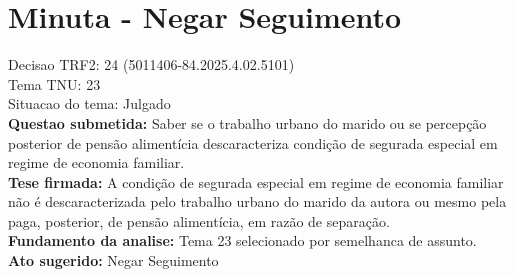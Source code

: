 \documentclass{article}
\begin{document}
\section*{Minuta - Negar Seguimento}
Decisao TRF2: 24 (5011406-84.2025.4.02.5101)\\
Tema TNU: 23\\
Situacao do tema: Julgado\\
\textbf{Questao submetida:} Saber se o trabalho urbano do marido ou se percepção posterior de pensão alimentícia descaracteriza condição de segurada especial em regime de economia familiar.\\
\textbf{Tese firmada:} A condição de segurada especial em regime de economia familiar não é descaracterizada pelo trabalho urbano do marido da autora ou mesmo pela paga, posterior, de pensão alimentícia, em razão de separação.\\
\textbf{Fundamento da analise:} Tema 23 selecionado por semelhanca de assunto.\\
\textbf{Ato sugerido:} Negar Seguimento
\end{document}
